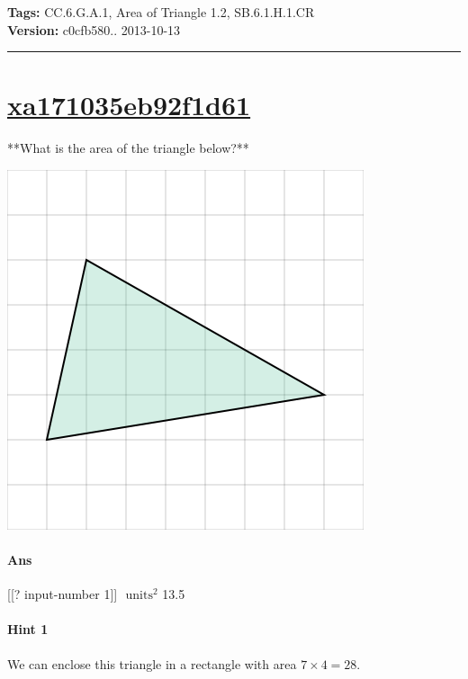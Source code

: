 \documentclass[twocolumn,10pt]{article}
\def\shrinkfactor{0.55}
\begin{document}
\medskip
\noindent
\textbf{Tags:} {\footnotesize CC.6.G.A.1, Area of Triangle 1.2, SB.6.1.H.1.CR}\\
\textbf{Version:} c0cfb580.. 2013-10-13
\smallskip\hrule





\section{\href{https://www.khanacademy.org/devadmin/content/items/xa171035eb92f1d61}{xa171035eb92f1d61}}

\noindent
**What is the area of the triangle below?**  


\includegraphics[scale=\shrinkfactor]{figures/817e4d036011ef1f48d458d530d4165a9e86f1cd.png}

\paragraph{Ans} [[? input-number 1]] $\text{ units}^2$  13.5

\paragraph{Hint 1}We can enclose this triangle in a rectangle with area $7 \times 4 =28$.   
\end{document}
